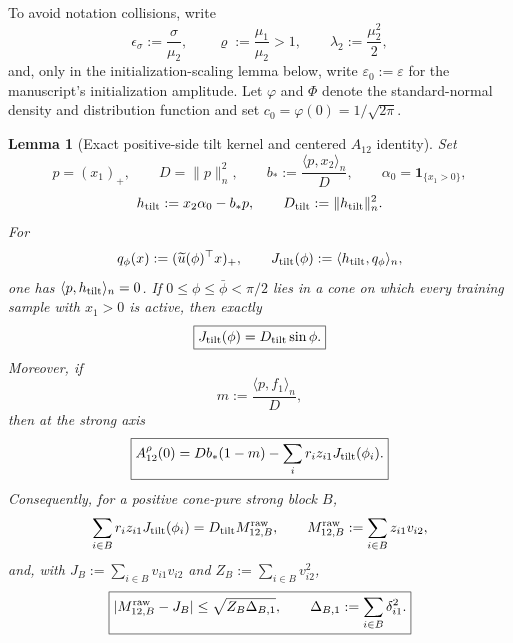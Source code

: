 \documentclass{article} %
\theoremstyle{plain}
\newtheorem{lemma}[theorem]{Lemma}
\theoremstyle{definition}
\theoremstyle{remark}
\begin{document}
To avoid notation collisions, write
\[
 \epsilon_\sigma:=\frac{\sigma}{\mu_2},
 \qquad
 \varrho:=\frac{\mu_1}{\mu_2}>1,
 \qquad
 \lambda_2:=\frac{\mu_2^2}{2},
\]
and, only in the initialization-scaling lemma below, write
$\varepsilon_0:=\varepsilon$ for the manuscript's initialization amplitude.
Let $\varphi$ and $\Phi$ denote the standard-normal density and distribution
function and set $c_0=\varphi(0)=1/\sqrt{2\pi}$.

\begin{lemma}[Exact positive-side tilt kernel and centered $A_{12}$ identity]
\label{sbcoh:tilt-kernel}
Set
\[
 p=(x_1)_+,
 \qquad
 D=\|p\|_n^2,
 \qquad
 b_*:=\frac{\langle p,x_2\rangle_n}{D},
 \qquad
 \alpha_0=\mathbf 1_{\{x_1>0\}},
\]
\[
 h_{\rm tilt}:=x_2\alpha_0-b_*p,
 \qquad
 D_{\rm tilt}:=\|h_{\rm tilt}\|_n^2.
\]
For
\[
 q_\phi(x):=(\widetilde u(\phi)^\top x)_+,
 \qquad
 J_{\rm tilt}(\phi):=\langle h_{\rm tilt},q_\phi\rangle_n,
\]
one has $\langle p,h_{\rm tilt}\rangle_n=0$.  If
$0\le\phi\le\bar\phi<\pi/2$ lies in a cone on which every training sample
with $x_1>0$ is active, then exactly
\begin{equation}\label{sbcoh:tilt-kernel-exact}
 \boxed{
 J_{\rm tilt}(\phi)=D_{\rm tilt}\sin\phi.
 }
\end{equation}
Moreover, if
\[
 m:=\frac{\langle p,f_1\rangle_n}{D},
\]
then at the strong axis
\begin{equation}\label{sbcoh:A12-axis}
 \boxed{
 A_{12}^\rho(0)
 =Db_*(1-m)
 -\sum_i r_i z_{i1}J_{\rm tilt}(\phi_i).
 }
\end{equation}
Consequently, for a positive cone-pure strong block $B$,
\begin{equation}\label{sbcoh:A12-strong-exact}
 \sum_{i\in B}r_i z_{i1}J_{\rm tilt}(\phi_i)
 =D_{\rm tilt}M_{12,B}^{\rm raw},
 \qquad
 M_{12,B}^{\rm raw}:=\sum_{i\in B}z_{i1}v_{i2},
\end{equation}
and, with $J_B:=\sum_{i\in B}v_{i1}v_{i2}$ and
$Z_B:=\sum_{i\in B}v_{i2}^2$,
\begin{equation}\label{sbcoh:raw-vs-input-cross}
 \boxed{
 |M_{12,B}^{\rm raw}-J_B|
 \le\sqrt{Z_B\Delta_{B,1}},
 \qquad
 \Delta_{B,1}:=\sum_{i\in B}\delta_{i1}^2.
 }
\end{equation}
\end{lemma}
\end{document}

